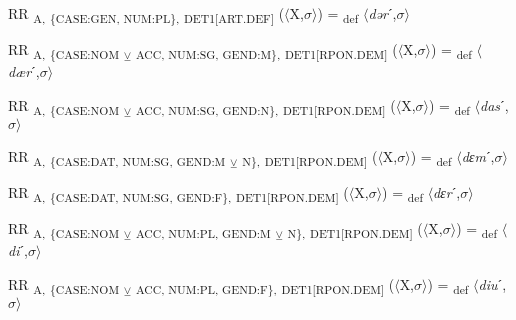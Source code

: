 {\begin{exe}
 RR \textsubscript{A,} \textsubscript{\{CASE:GEN, NUM:PL\},} \textsubscript{DET1[ART.DEF]} ($\langle$X,$\sigma $$\rangle$) = \textsubscript{def} $\langle$\textit{dər}ˊ,$\sigma $$\rangle$
\end{exe}

\begin{exe}
 RR \textsubscript{A,} \textsubscript{\{CASE:NOM} \textsubscript{${\veebar}$}\textsubscript{ ACC, NUM:SG, GEND:M\},} \textsubscript{DET1[RPON.DEM]} ($\langle$X,$\sigma $$\rangle$) = \textsubscript{def} $\langle$\textit{dær}ˊ,$\sigma $$\rangle$
\end{exe}

\begin{exe}
 RR \textsubscript{A,} \textsubscript{\{CASE:NOM} \textsubscript{${\veebar}$}\textsubscript{ ACC, NUM:SG, GEND:N\},} \textsubscript{DET1[RPON.DEM]} ($\langle$X,$\sigma $$\rangle$) = \textsubscript{def} $\langle$\textit{das}ˊ,$\sigma $$\rangle$
\end{exe}

\begin{exe}
 RR \textsubscript{A,} \textsubscript{\{CASE:DAT, NUM:SG, GEND:M} \textsubscript{${\veebar}$}\textsubscript{ N\},} \textsubscript{DET1[RPON.DEM]} ($\langle$X,$\sigma $$\rangle$) = \textsubscript{def} $\langle$\textit{dɛm}ˊ,$\sigma $$\rangle$
\end{exe}

\begin{exe}
 RR \textsubscript{A,} \textsubscript{\{CASE:DAT, NUM:SG, GEND:F\},} \textsubscript{DET1[RPON.DEM]} ($\langle$X,$\sigma $$\rangle$) = \textsubscript{def} $\langle$\textit{dɛr}ˊ,$\sigma $$\rangle$
\end{exe}

\begin{exe}
 RR \textsubscript{A,} \textsubscript{\{CASE:NOM} \textsubscript{${\veebar}$}\textsubscript{ ACC, NUM:PL, GEND:M} \textsubscript{${\veebar}$}\textsubscript{ N\},} \textsubscript{DET1[RPON.DEM]} ($\langle$X,$\sigma $$\rangle$) = \textsubscript{def} $\langle$\textit{di}ˊ,$\sigma $$\rangle$
\end{exe}

\begin{exe}
 RR \textsubscript{A,} \textsubscript{\{CASE:NOM} \textsubscript{${\veebar}$}\textsubscript{ ACC, NUM:PL, GEND:F\},} \textsubscript{DET1[RPON.DEM]} ($\langle$X,$\sigma $$\rangle$) = \textsubscript{def} $\langle$\textit{diu}ˊ,$\sigma $$\rangle$
\end{exe}

}
